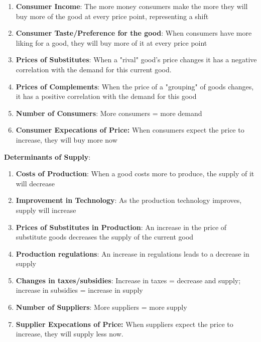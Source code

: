 \documentclass{article}
\begin{document}
\begin{enumerate}
    \item \textbf{Consumer Income}: The more money consumers make the more they will buy more of the good at every price point, representing a shift
    \item \textbf{Consumer Taste/Preference for the good}: When consumers have more liking for a good, they will buy more of it at every price point
    \item \textbf{Prices of Substitutes}: When a "rival" good's price changes it has a negative correlation with the demand for this current good. 
    \item \textbf{Prices of Complements}: When the price of a "grouping" of goods changes, it has a positive correlation with the demand for this good
    \item \textbf{Number of Consumers}: More consumers = more demand
    \item \textbf{Consumer Expecations of Price:} When consumers expect the price to increase, they will buy more now
\end{enumerate}



\textbf{Determinants of Supply}:
\begin{enumerate}
    \item \textbf{Costs of Production}: When a good costs more to produce, the supply of it will decrease
    \item \textbf{Improvement in Technology}: As the production technology improves, supply will increase
    \item \textbf{Prices of Substitutes in Production}: An increase in the price of substitute goods decreases the supply of the current good
    \item \textbf{Production regulations}: An increase in regulations leads to a decrease in supply
    \item  \textbf{Changes in taxes/subsidies}: Increase in taxes = decrease and supply; increase in subsidies = increase in supply
    \item \textbf{Number of Suppliers}: More suppliers = more supply
    \item \textbf{Supplier Expecations of Price:} When suppliers expect the price to increase, they will supply less now.

\end{enumerate}

\newpage
\end{document}
